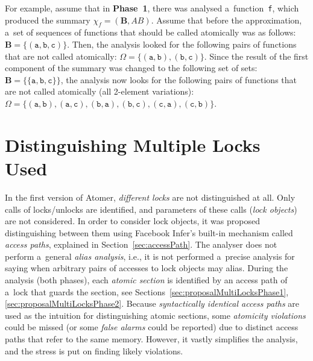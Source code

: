 \begin{example}
    For example, assume that in \textbf{Phase~1}, there was analysed
    a~function~\texttt{f}, which produced the summary $ \chi_f =
    {(\boldsymbol{B}, AB)} $. Assume that before the approximation,
    a~set of sequences of functions that should be called atomically was
    as follows: $ \boldsymbol{B} = \{{(\mathtt{a}, \mathtt{b},
    \mathtt{c})}\} $. Then, the analysis looked for the following
    pairs of functions that are not called atomically: $ \Omega =
    \{{(\mathtt{a, b})}, {(\mathtt{b, c})}\} $. Since the result of the
    first component of the summary was changed to the following set of
    sets: $ \boldsymbol{B} = \{{\{\mathtt{a}, \mathtt{b}, \mathtt{c}\}}\} $,
    the analysis now looks for the following pairs  of functions that are not
    called atomically (all 2-element variations): $ \Omega = \{{(\mathtt{a},
    \mathtt{b})}, {(\mathtt{a}, \mathtt{c})}, {(\mathtt{b}, \mathtt{a})},
    {(\mathtt{b}, \mathtt{c})}, {(\mathtt{c}, \mathtt{a})}, {(\mathtt{c},
    \mathtt{b})}\} $.
\end{example}


\section{Distinguishing Multiple Locks Used}
\label{sec:proposalMultiLocks}

In the first version of Atomer, \emph{different locks} are not distinguished
at all. Only calls of locks/unlocks are identified, and parameters of these
calls (\emph{lock objects}) are not considered. In order to consider lock
objects, it was proposed distinguishing between them using Facebook Infer's
built-in mechanism called \emph{access paths}, explained in
Section~\ref{sec:accessPath}. The analyser does not perform a~general
\emph{alias analysis}, i.e., it is not performed a~precise analysis for
saying when arbitrary pairs of accesses to lock objects may alias. During
the analysis (both phases), each \emph{atomic section} is identified by an
access path of a~lock that guards the section, see
Sections~\ref{sec:proposalMultiLocksPhase1}, \ref{sec:proposalMultiLocksPhase2}.
Because \emph{syntactically identical access paths} are used as the intuition
for distinguishing atomic sections, some \emph{atomicity violations} could be
missed (or some \emph{false alarms} could be reported) due to distinct access
paths that refer to the same memory. However, it vastly simplifies the
analysis, and the stress is put on finding likely violations.

